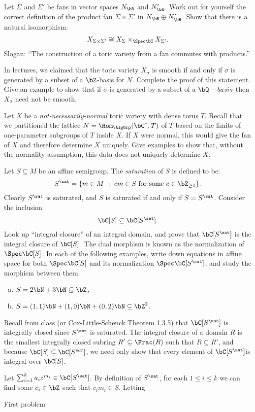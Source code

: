 \begin{homework}[e]
	\prob Let $\Sigma$ and $\Sigma'$ be fans in vector spaces $N_\bR$ and $N_\bR'$. Work out for yourself the correct definition of the product fan $\Sigma\times \Sigma'$ in $N_\bR \oplus N_\bR'$. Show that there is a natural isomorphism:
	\begin{align*}
		X_{\Sigma\times \Sigma'} \cong X_\Sigma \times_{\Spec \bC} X_{\Sigma'}.
	\end{align*}
	Slogan: ``The construction of a toric variety from a fan commutes with products.''

	\prob In lectures, we claimed that the toric variety $X_\sigma$ is smooth if and only if $\sigma$ is generated by a subset of a $\bZ$-basis for $N$. Complete the proof of this statement. Give an example to show that if $\sigma$ is generated by a subset of a $\bQ-basis$ then $X_\sigma$ need not be smooth.
	
	\prob Let $X$ be a \emph{not-necessarily-normal} toric variety with dense torus $T$. Recall that we partitioned the lattice $N = \Hom_{\AlgGrp}(\bC^*, T)$ of $T$ based on the limits of one-parameter subgroups of $T$ inside $X$. If $X$ were normal, this would give the fan of $X$ and therefore determine $X$ uniquely. Give examples to show that, without the normality assumption, this data does not uniquely determine $X$. 

	\prob Let $S \subseteq M$ be an affine semigroup. The \emph{saturation} of $S$ is defined to be:
	\begin{align*}
		S^{\sat} = \{m \in M ~ : ~ cm \in S \text{ for some } c\in\bZ _{\geq 1}\}.
	\end{align*}
	Clearly $S^{\sat}$ is saturated, and $S$ is saturated if and only if $S = S^{\sat}$. Consider the inclusion
	\begin{align*}
		\bC[S] \subseteq \bC[S^{\sat}].
	\end{align*}
	Look up ``integral closure'' of an integral domain, and prove that $\bC[S^{\sat}]$ is the integral closure of $\bC[S]$. The dual morphism is known as the normalization of $\Spec \bC[S]$. In each of the following examples, write down equations in affine space for both $\Spec \bC[S]$ and its normalization $\Spec \bC[S^{\sat}]$, and study the morphism between them:
	\begin{enumerate}[(a)]
		\item $S = 2\bN + 3\bN \subseteq \bZ$, 
		\item $S = (1,1)\bN + (1,0)\bN + (0,2)\bN \subseteq \bZ^{2}$.
	\end{enumerate}
	\begin{prf}
		Recall from class (or Cox-Little-Schenck Theorem 1.3.5) that $\bC[S^{\sat}]$ is integrally closed since $S^{\sat}$ is saturated. The integral closure of a domain $R$ is the smallest integrally closed subring $R' \subseteq \Frac(R)$ such that $R \subseteq R'$, and because $\bC[S] \subseteq \bC[S^{sat}]$, we need only show that every element of $\bC[S^{\sat}]$is integral over $\bC[S]$.

		Let $\sum_{i=1}^k a_i z^{m_i} \in \bC[S^{\sat}]$. By definition of $S^{\sat}$, for each $1\leq i\leq k$ we can find some $c_i \in \bZ$ such that $c_im_i \in S$. Letting  
	\end{prf}
\end{homework}

\begin{homework}[e]
	\prob First problem
\end{homework}


